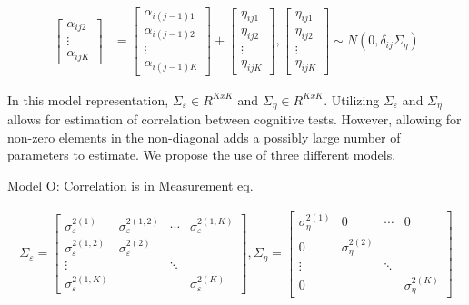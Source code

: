 \documentclass[
]{article}
\begin{document}
\begin{equation*}
\begin{aligned}
\begin{bmatrix}
\alpha_{ij2}\\
\vdots\\
\alpha_{ijK}
\end{bmatrix} & = 
\begin{bmatrix}
\alpha_{i(j-1)1}\\
\alpha_{i(j-1)2}\\
\vdots\\
\alpha_{i(j-1)K}
\end{bmatrix} +
\begin{bmatrix}
\eta_{ij1}\\
\eta_{ij2}\\
\vdots\\
\eta_{ijK}
\end{bmatrix}, 
\begin{bmatrix}
\eta_{ij1}\\
\eta_{ij2}\\
\vdots\\
\eta_{ijK}
\end{bmatrix} \sim N(0, \delta_{ij}\Sigma_\eta)
\end{aligned}
\end{equation*}

In this model representation, \(\Sigma_\varepsilon \in R^{KxK}\) and \(\Sigma_\eta \in R^{KxK}\). Utilizing \(\Sigma_\varepsilon\) and \(\Sigma_\eta\) allows for estimation of correlation between cognitive tests. However, allowing for non-zero elements in the non-diagonal adds a possibly large number of parameters to estimate. We propose the use of three different models,

Model O: Correlation is in Measurement eq.

\begin{equation*}
\begin{aligned}
\Sigma_\varepsilon =
\begin{bmatrix}
\sigma^{2(1)}_\varepsilon & \sigma^{2(1,2)}_\varepsilon & \cdots & \sigma^{2(1, K)}_\varepsilon\\
\sigma^{2(1,2)}_\varepsilon & \sigma^{2(2)}_\varepsilon\\
\vdots & & \ddots\\
\sigma^{2(1, K)}_\varepsilon & & &\sigma^{2(K)}_\varepsilon
\end{bmatrix},
\Sigma_\eta = 
\begin{bmatrix}
\sigma^{2(1)}_\eta & 0 & \cdots & 0\\
0 & \sigma^{2(2)}_\eta\\
\vdots & & \ddots\\
0 & & &\sigma^{2(K)}_\eta
\end{bmatrix}
\end{aligned}
\end{equation*}
\end{document}
